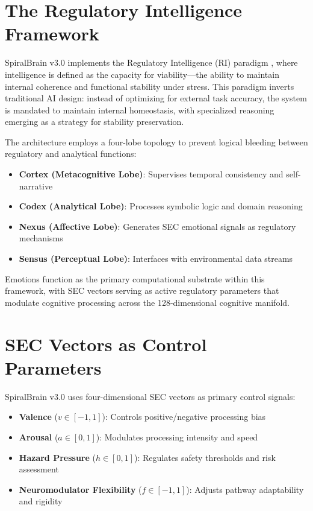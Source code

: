 \documentclass[12pt,a4paper]{article}
\begin{document}
\section{The Regulatory Intelligence Framework}

SpiralBrain v3.0 implements the Regulatory Intelligence (RI) paradigm \cite{Cragin2026RI}, where intelligence is defined as the capacity for viability—the ability to maintain internal coherence and functional stability under stress. This paradigm inverts traditional AI design: instead of optimizing for external task accuracy, the system is mandated to maintain internal homeostasis, with specialized reasoning emerging as a strategy for stability preservation.

The architecture employs a four-lobe topology to prevent logical bleeding between regulatory and analytical functions:

\begin{itemize}
\item \textbf{Cortex (Metacognitive Lobe)}: Supervises temporal consistency and self-narrative
\item \textbf{Codex (Analytical Lobe)}: Processes symbolic logic and domain reasoning  
\item \textbf{Nexus (Affective Lobe)}: Generates SEC emotional signals as regulatory mechanisms
\item \textbf{Sensus (Perceptual Lobe)}: Interfaces with environmental data streams
\end{itemize}

Emotions function as the primary computational substrate within this framework, with SEC vectors serving as active regulatory parameters that modulate cognitive processing across the 128-dimensional cognitive manifold.

\section{SEC Vectors as Control Parameters}

SpiralBrain v3.0 uses four-dimensional SEC vectors as primary control signals:

\begin{itemize}
\item \textbf{Valence} ($v \in [-1,1]$): Controls positive/negative processing bias
\item \textbf{Arousal} ($a \in [0,1]$): Modulates processing intensity and speed
\item \textbf{Hazard Pressure} ($h \in [0,1]$): Regulates safety thresholds and risk assessment
\item \textbf{Neuromodulator Flexibility} ($f \in [-1,1]$): Adjusts pathway adaptability and rigidity
\end{itemize}
\end{document}
